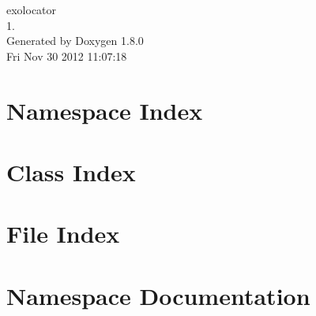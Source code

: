 \documentclass{book}
\begin{document}
\hypersetup{pageanchor=false,citecolor=blue}
\begin{titlepage}
\vspace*{7cm}
\begin{center}
{\Large exolocator \\[1ex]\large 1. }\\
\vspace*{1cm}
{\large Generated by Doxygen 1.8.0}\\
\vspace*{0.5cm}
{\small Fri Nov 30 2012 11:07:18}\\
\end{center}
\end{titlepage}
\clearemptydoublepage
{}
\tableofcontents
\clearemptydoublepage
{}
\hypersetup{pageanchor=true,citecolor=blue}
\chapter{Namespace Index}

\chapter{Class Index}

\chapter{File Index}

\chapter{Namespace Documentation}












































\end{document}
